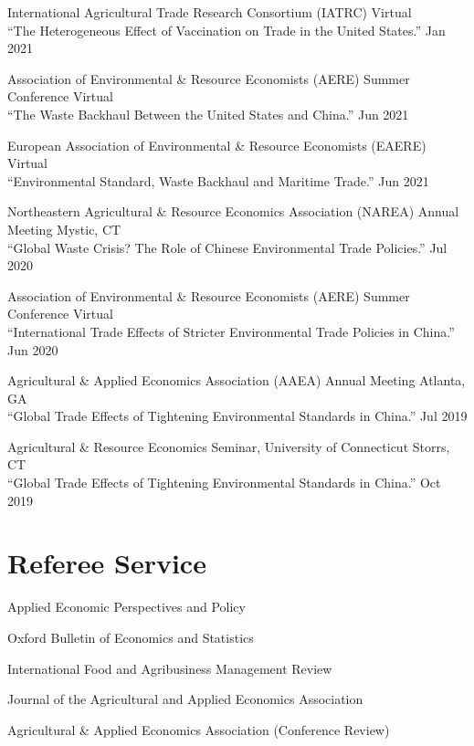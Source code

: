 \documentclass[10.5pt,letterpaper]{article}
\renewenvironment{itemize}{
	\begin{list}{}{
			\setlength{\leftmargin}{1.5em}
		}
	}{
	\end{list}
}
\begin{document}
\begin{itemize}
	\item[-] International Agricultural Trade Research Consortium (IATRC) \hfill Virtual \\
	“The Heterogeneous Effect of Vaccination on Trade in the United States.” \hfill Jan 2021  
	
	\item[-] Association of Environmental \& Resource Economists (AERE) Summer Conference \hfill Virtual \\
	“The Waste Backhaul Between the United States and China.” \hfill Jun 2021  
	
	\item[-] European Association of Environmental \& Resource Economists (EAERE) \hfill Virtual \\
	“Environmental Standard, Waste Backhaul and Maritime Trade.” \hfill Jun 2021  
	
	\item[-] Northeastern Agricultural \& Resource Economics Association (NAREA) Annual Meeting \hfill Mystic, CT \\
	“Global Waste Crisis? The Role of Chinese Environmental Trade Policies.” \hfill Jul 2020  
	
	\item[-] Association of Environmental \& Resource Economists (AERE) Summer Conference \hfill Virtual \\
	“International Trade Effects of Stricter Environmental Trade Policies in China.” \hfill Jun 2020  
	
	\item[-] Agricultural \& Applied Economics Association (AAEA) Annual Meeting \hfill Atlanta, GA \\
	“Global Trade Effects of Tightening Environmental Standards in China.” \hfill Jul 2019  
	
	\item[-] Agricultural \& Resource Economics Seminar, University of Connecticut \hfill Storrs, CT \\
	“Global Trade Effects of Tightening Environmental Standards in China.” \hfill Oct 2019  
	
\end{itemize}


	
	\section*{\textbf{Referee Service}}
	\begin{itemize}
		\item[-] Applied Economic Perspectives and Policy
		\item[-] Oxford Bulletin of Economics and Statistics
		\item[-] International Food and Agribusiness Management Review
		\item[-] Journal of the Agricultural and Applied Economics Association
		\item[-] Agricultural \& Applied Economics Association (Conference Review)
	\end{itemize}
	
\end{document}
